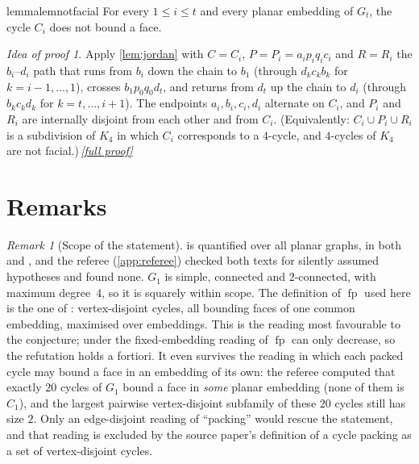 \documentclass[11pt,a4paper]{article}
\theoremstyle{plain}
\theoremstyle{definition}
\theoremstyle{remark}
\newtheorem{remark}[theorem]{Remark}
\newtheorem*{proofidea}{Idea of proof}
\newcommand{\fullproofref}[1]{\,\hyperref[#1]{\textit{[full proof]}}}
\newcommand{\fp}{\operatorname{fp}}
\newcommand{\Gtt}{G_t}
\begin{document}
\begin{restatable}[No $C_i$ is facial]{lemma}{lemnotfacial}\label{lem:notfacial}
For every $1\le i\le t$ and every planar embedding of $\Gtt$, the cycle $C_i$ does not bound a face.
\end{restatable}
\begin{proofidea}
Apply \cref{lem:jordan} with $C=C_i$, $P=P_i=a_ip_iq_ic_i$ and $R=R_i$ the $b_i$--$d_i$ path that runs from $b_i$ down the chain to $b_1$ (through $d_{k}c_{k}b_{k}$ for $k=i-1,\dots,1$), crosses $b_1p_0q_0d_t$, and returns from $d_t$ up the chain to $d_i$ (through $b_kc_kd_k$ for $k=t,\dots,i+1$). The endpoints $a_i,b_i,c_i,d_i$ alternate on $C_i$, and $P_i$ and $R_i$ are internally disjoint from each other and from $C_i$. (Equivalently: $C_i\cup P_i\cup R_i$ is a subdivision of $K_4$ in which $C_i$ corresponds to a $4$-cycle, and $4$-cycles of $K_4$ are not facial.)\fullproofref{pf:notfacial}
\end{proofidea}

\section{Remarks}

\begin{remark}[Scope of the statement]\label{rem:scope}
 is quantified over all planar graphs, in both \cite{BDMNPP19} and \cite{BDMNPP21}, and the referee (\cref{app:referee}) checked both texts for silently assumed hypotheses and found none. $G_1$ is simple, connected and $2$-connected, with maximum degree~$4$, so it is squarely within scope. The definition of $\fp$ used here is the one of \cite{BDMNPP19}: vertex-disjoint cycles, all bounding faces of one common embedding, maximised over embeddings. This is the reading most favourable to the conjecture; under the fixed-embedding reading of \cite[Definition~1.5]{BG24} $\fp$ can only decrease, so the refutation holds a fortiori. It even survives the reading in which each packed cycle may bound a face in an embedding of its own: the referee computed that exactly $20$ cycles of $G_1$ bound a face in \emph{some} planar embedding (none of them is $C_1$), and the largest pairwise vertex-disjoint subfamily of these $20$ cycles still has size $2$. Only an edge-disjoint reading of ``packing'' would rescue the statement, and that reading is excluded by the source paper's definition of a cycle packing as a set of vertex-disjoint cycles.
\end{remark}
\end{document}
